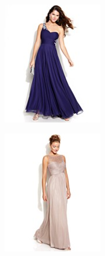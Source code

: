 \documentclass[11pt]{article}
\begin{document}
\begin{figure}
\centering
\begin{subfigure}{.18\textwidth}
\centering
\includegraphics[width=\linewidth]{concepts/concept1_neg1.jpg}
\label{fig:sub1}
\end{subfigure}%
\begin{subfigure}{.18\textwidth}
\centering
\includegraphics[width=\linewidth]{concepts/concept1_neg2.jpg}

\end{subfigure}
\end{figure}
\end{document}
